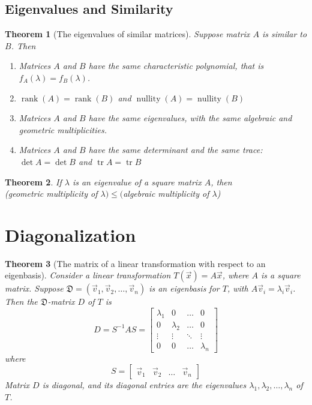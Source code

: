 \documentclass[letter]{article}
\newcommand{\rank}{\operatorname{rank}}
\newcommand{\nullity}{\operatorname{nullity}}
\newcommand{\tr}{\operatorname{tr}}
\newtheorem{theorem}{Theorem}[section]
\begin{document}
\subsection{Eigenvalues and Similarity}
\begin{theorem}[The eigenvalues of similar matrices]
Suppose matrix $A$ is similar to $B$. Then \\
\begin{enumerate}
\item Matrices $A$ and $B$ have the same characteristic polynomial, that is $f_A(\lambda) = f_B(\lambda)$.
\item $\rank(A) = \rank(B)$ and $\nullity(A) = \nullity(B)$
\item Matrices $A$ and $B$ have the same eigenvalues, with the same algebraic and geometric multiplicities.
\item Matrices $A$ and $B$ have the same determinant and the same trace: $\det A = \det B$ and $\tr A = \tr B$
\end{enumerate}
\end{theorem}

\begin{theorem}
If $\lambda$ is an eigenvalue of a square matrix $A$, then\\
(geometric multiplicity of $\lambda) \leq ($algebraic multiplicity of $\lambda$)
\end{theorem}

\section{Diagonalization}
\begin{theorem}[The matrix of a linear transformation with respect to an eigenbasis]
Consider a linear transformation $T(\vec x) = A \vec x$, where $A$ is a square matrix. Suppose $\mathfrak{D} = (\vec v_1,\vec v_2,\ldots,\vec v_n)$ is an eigenbasis for $T$, with $A\vec v_i = \lambda_i\vec v_i$. Then the $\mathfrak{D}$-matrix $D$ of $T$ is
\[
D = S^{-1}AS = 
\begin{bmatrix}
\lambda_1 & 0 & \ldots & 0\\
0 & \lambda_2 & \ldots & 0\\
\vdots & \vdots &\ddots &\vdots\\
0 & 0 &\ldots & \lambda_n 
\end{bmatrix}
\]
where
\[
S = 
\begin{bmatrix}
\vec v_1 & \vec v_2 & \ldots & \vec v_n
\end{bmatrix}
\]
Matrix $D$ is diagonal, and its diagonal entries are the eigenvalues $\lambda_1, \lambda_2, \ldots, \lambda_n$ of $T$.
\end{theorem}
\end{document}

